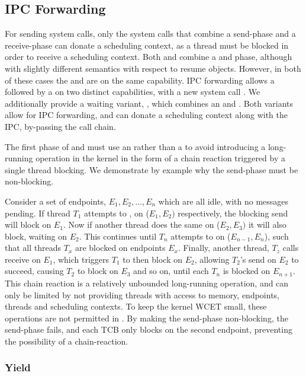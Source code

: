 \subsection{IPC Forwarding}

For sending system calls, only the system calls that combine a send-phase and a receive-phase can donate
a scheduling context, as a thread must be blocked in order to receive a scheduling context. Both
\call and \replyrecv combine a \send and \recv phase, although with slightly different semantics
with respect to resume objects. However, in both of these cases the \send and \recv are on the same
capability. IPC forwarding allows a \nbsend followed by a \recv on two distinct capabilities, with a
new system call \nbsendrecv. We additionally provide a waiting variant, \nbsendwait, which combines
an \nbsend and \wait. Both variants allow for IPC forwarding, and can donate a scheduling context
along with the IPC, by-passing the call chain. 

The first phase of \nbsendrecv and \nbsendwait must use an \nbsend rather than a \send
to avoid introducing a long-running operation in the kernel in the form of a chain reaction
triggered by a single thread blocking. We demonstrate by example why the send-phase must be
non-blocking.

Consider a set of endpoints, $E_{1}, E_{2},\ldots,E_{n}$ which are all idle, with no messages
pending. If thread $T_{1}$ attempts to \sendrecv,
on ($E_{1},E_{2})$ respectively, the blocking send will block on $E_{1}$. Now if another thread
does the same on ($E_{2},E_{3})$ it will also block, waiting on $E_{2}$. This continues until
$T_{n}$ attempts to \sendrecv on ($E_{n-1},E_{n}$), such that all threads $T_{x}$ are blocked on
endpoints $E_{x}$. Finally, another thread, $T_{z}$ calls receive on $E_{1}$, which triggers $T_{1}$ to then
block on $E_{2}$, allowing $T_{2}$'s send on $E_{2}$ to succeed, causing $T_{2}$ to block on
$E_{3}$ and so on, until each $T_{n}$ is blocked on $E_{n+1}$. This chain reaction is a relatively
unbounded long-running operation, and can only be limited by not providing threads with access to
memory, endpoints, threads and scheduling contexts. To keep the kernel \gls{WCET} small, these
operations are not permitted in \selfour. By making the send-phase non-blocking, the send-phase fails, and
each \gls{TCB} only blocks on the second endpoint, preventing the possibility of a chain-reaction. 

\subsubsection{Yield}

